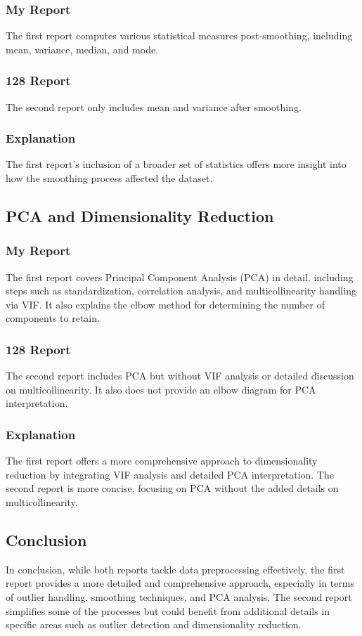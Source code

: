 \subsubsection*{My Report}
The first report computes various statistical measures post-smoothing, including mean, variance, median, and mode.

\subsubsection*{128 Report}
The second report only includes mean and variance after smoothing.

\subsubsection*{Explanation}
The first report’s inclusion of a broader set of statistics offers more insight into how the smoothing process affected the dataset.

\subsection*{PCA and Dimensionality Reduction}

\subsubsection*{My Report}
The first report covers Principal Component Analysis (PCA) in detail, including steps such as standardization, correlation analysis, and multicollinearity handling via VIF. It also explains the elbow method for determining the number of components to retain.

\subsubsection*{128 Report}
The second report includes PCA but without VIF analysis or detailed discussion on multicollinearity. It also does not provide an elbow diagram for PCA interpretation.

\subsubsection*{Explanation}
The first report offers a more comprehensive approach to dimensionality reduction by integrating VIF analysis and detailed PCA interpretation. The second report is more concise, focusing on PCA without the added details on multicollinearity.

\subsection*{Conclusion}

In conclusion, while both reports tackle data preprocessing effectively, the first report provides a more detailed and comprehensive approach, especially in terms of outlier handling, smoothing techniques, and PCA analysis. The second report simplifies some of the processes but could benefit from additional details in specific areas such as outlier detection and dimensionality reduction.
